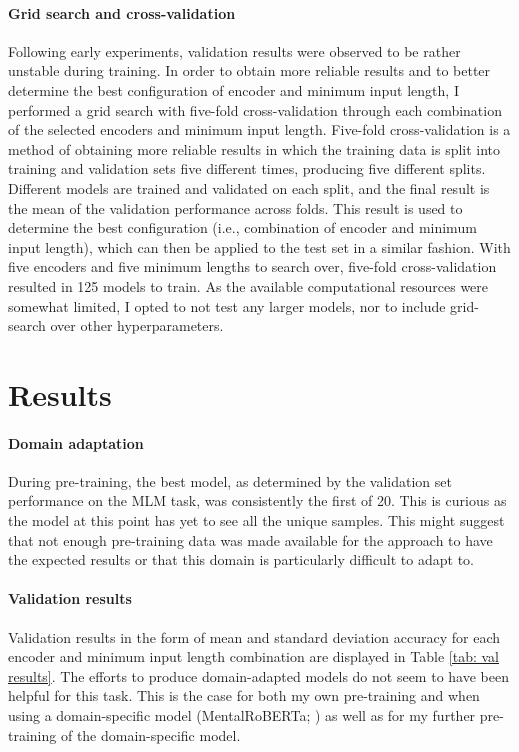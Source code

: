 \documentclass[12pt]{report}
\begin{document}
\paragraph*{Grid search and cross-validation}
Following early experiments, validation results were observed to be rather unstable during training.
In order to obtain more reliable results and to better determine the best configuration of encoder and minimum input length, I performed a grid search with five-fold cross-validation through each combination of the selected encoders and minimum input length.
Five-fold cross-validation is a method of obtaining more reliable results in which the training data is split into training and validation sets five different times, producing five different splits.
Different models are trained and validated on each split, and the final result is the mean of the validation performance across folds.
This result is used to determine the best configuration (i.e., combination of encoder and minimum input length), which can then be applied to the test set in a similar fashion.
With five encoders and five minimum lengths to search over, five-fold cross-validation resulted in 125 models to train.
As the available computational resources were somewhat limited, I opted to not test any larger models, nor to include grid-search over other hyperparameters.

\section{Results}
\paragraph*{Domain adaptation}
During pre-training, the best model, as determined by the validation set performance on the MLM task, was consistently the first of 20.
This is curious as the model at this point has yet to see all the unique samples.
This might suggest that not enough pre-training data was made available for the approach to have the expected results or that this domain is particularly difficult to adapt to.

\paragraph*{Validation results}
Validation results in the form of mean and standard deviation accuracy for each encoder and minimum input length combination are displayed in Table \ref{tab: val results}.
The efforts to produce domain-adapted models do not seem to have been helpful for this task.
This is the case for both my own pre-training and when using a domain-specific model (MentalRoBERTa; ) as well as for my further pre-training of the domain-specific model.
\end{document}
